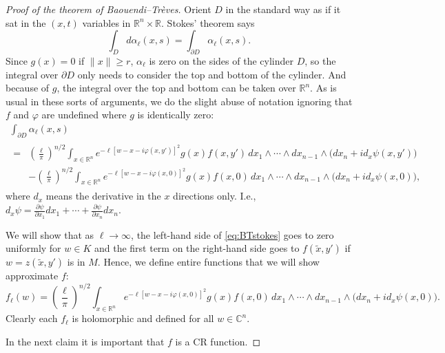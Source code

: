 \documentclass[12pt,openany]{book}
\newcommand{\snorm}[1]{\lVert {#1} \rVert}
\newcommand{\C}{{\mathbb{C}}}
\newcommand{\R}{{\mathbb{R}}}
\theoremstyle{plain}
\theoremstyle{remark}
\theoremstyle{definition}
\theoremstyle{exercise}
\theoremstyle{example}
\begin{document}
\begin{proof}[Proof of the theorem of Baouendi--Tr{\`e}ves]
Orient $D$ in
the standard way as if it sat in the $(x,t)$ variables in $\R^n \times \R$.
Stokes' theorem says
\begin{equation*}
\int_D d \alpha_{\ell} (x,s)
=
\int_{\partial D} \alpha_{\ell} (x,s) .
\end{equation*}
Since $g(x) = 0$ if $\snorm{x} \geq r$, $\alpha_\ell$ is zero on the sides
of the cylinder $D$, so the integral over $\partial D$ only needs to
consider the top and bottom of the cylinder.
And because of $g$, the integral over the top and bottom
can be taken over $\R^n$.
As is usual in these sorts of arguments, we do the slight abuse of notation
ignoring that $f$ and $\varphi$ are undefined
where $g$ is identically zero:
\begin{multline} \label{eq:BTstokes}
\int_{\partial D} \alpha_{\ell}(x,s)
\\
\begin{aligned}
=
&
{\left(\frac{\ell}{\pi}\right)}^{n/2}
\int_{x \in \R^n}
\!\!\!
e^{-\ell [w - x-i\varphi(x,y')]^2 } g(x) f(x,y')
\,
dx_1  \wedge
\cdots \wedge
dx_{n-1}
\wedge
\bigl(dx_{n} + i d_x \psi (x,y') \bigr)
\\
&
-
{\left(\frac{\ell}{\pi}\right)}^{n/2}
\int_{x \in \R^n}
\!\!\!
e^{  -\ell [w - x-i\varphi(x,0)]^2 } g(x) f(x,0)
\,
dx_1  \wedge
\cdots \wedge
dx_{n-1}
\wedge
\bigl(dx_{n} + i d_x \psi (x,0) \bigr) ,
\end{aligned}
\end{multline}
where $d_x$ means the derivative in the $x$ directions only.
I.e., $d_x \psi =
\frac{\partial \psi}{\partial x_1} dx_1
+ \cdots +
\frac{\partial \psi}{\partial x_n} dx_n$.


We will show that as $\ell \to \infty$, the left-hand side of \eqref{eq:BTstokes}
goes to zero uniformly for $w \in K$
and the first term on the right-hand side goes to $f(\tilde{x},y')$
if $w = z(\tilde{x},y')$ is in $M$.  Hence,
we define entire functions that we will show approximate $f$:
\begin{equation*}
f_\ell(w)
=
{\left(\frac{\ell}{\pi}\right)}^{n/2}
\int_{x \in \R^n}
e^{  -\ell [w - x-i\varphi(x,0)]^2 } g(x) f(x,0)
\,
dx_1  \wedge
\cdots \wedge
dx_{n-1}
\wedge
\bigl(dx_{n} + i d_x \psi (x,0) \bigr) .
\end{equation*}
Clearly each $f_\ell$ is holomorphic and defined for all $w \in \C^n$.

In the next claim it is important that $f$ is a CR function.


\end{proof}
\end{document}
